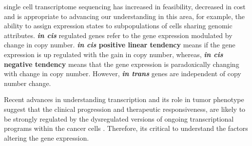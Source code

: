 single cell transcriptome sequencing has increased in feasibility, decreased in cost and is appropriate to advancing our understanding in this area, for example, the ability to assign expression states to subpopulations of cells sharing genomic attributes. \textbf{\textit{in cis}} regulated genes refer to the gene expression modulated by change in copy number. \textbf{{\textit{in cis} positive linear tendency}} means if the gene expression is up regulated with the gain in copy number, whereas, \textbf{{\textit{in cis} negative tendency}} means that the gene expression is paradoxically changing with change in copy number. However, \textbf{\textit{in trans}} genes are independent of copy number change.

Recent advances in understanding transcription and its role in tumor phenotype suggest that the clinical progression and therapeutic responsiveness, are likely to be strongly regulated by the dysregulated versions of ongoing transcriptional programs within the cancer cells \cite{lawrence2014discovery, sur2016role}. Therefore, its critical to understand the factors altering the gene expression.

